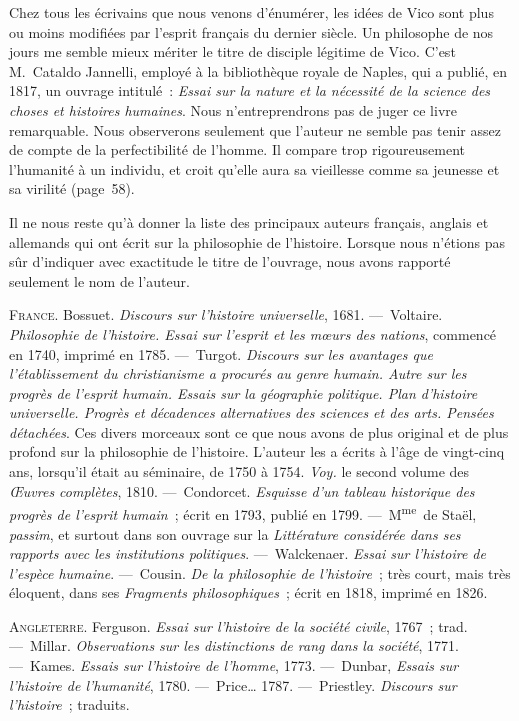 \documentclass[french,twoside]{book} %
\begin{document}
Chez tous les écrivains que nous venons d’énumérer, les idées de Vico sont plus ou moins modifiées par l’esprit français du dernier siècle. Un philosophe de nos jours me semble mieux mériter le titre de disciple légitime de Vico. C’est M. Cataldo Jannelli, employé à la bibliothèque royale de Naples, qui a publié, en 1817, un ouvrage intitulé : {\itshape Essai sur la nature et la nécessité de la science des choses et histoires humaines}. Nous n’entreprendrons pas de juger ce livre remarquable. Nous observerons seulement que l’auteur ne semble pas tenir assez de compte  de la perfectibilité de l’homme. Il compare trop rigoureusement l’humanité à un individu, et croit qu’elle aura sa vieillesse comme sa jeunesse et sa virilité (page 58).\par
\par
Il ne nous reste qu’à donner la liste des principaux auteurs français, anglais et allemands qui ont écrit sur la philosophie de l’histoire. Lorsque nous n’étions pas sûr d’indiquer avec exactitude le titre de l’ouvrage, nous avons rapporté seulement le nom de l’auteur.\par
{\scshape France.} Bossuet. {\itshape Discours sur l’histoire universelle}, 1681. — Voltaire. {\itshape Philosophie de l’histoire. Essai sur l’esprit et les mœurs des nations}, commencé en 1740, imprimé en 1785. — Turgot. {\itshape Discours sur les avantages que l’établissement du christianisme a procurés au genre humain. Autre sur les progrès de l’esprit humain. Essais sur la géographie politique. Plan d’histoire universelle. Progrès et décadences alternatives des sciences et des arts. Pensées détachées}. Ces divers morceaux sont ce que nous avons de plus original et de plus profond sur la philosophie de l’histoire. L’auteur les a écrits à l’âge de vingt-cinq ans, lorsqu’il était au séminaire, de 1750 à 1754. {\itshape Voy.} le second volume des {\itshape Œuvres complètes}, 1810. — Condorcet. {\itshape Esquisse d’un tableau historique des progrès de l’esprit humain} ; écrit en 1793, publié en 1799. — M\textsuperscript{me} de Staël, {\itshape passim}, et surtout dans son ouvrage sur la {\itshape Littérature considérée dans ses rapports avec les institutions politiques}. — Walckenaer. {\itshape Essai sur l’histoire de l’espèce humaine}. — Cousin. {\itshape De la philosophie de l’histoire} ; très court, mais très éloquent, dans ses {\itshape Fragments philosophiques} ; écrit en 1818, imprimé en 1826.\par
{\scshape Angleterre.} Ferguson. {\itshape Essai sur l’histoire de la société civile}, 1767 ; trad. — Millar. {\itshape Observations sur les distinctions de rang dans la société}, 1771. — Kames. {\itshape Essais sur l’histoire de l’homme}, 1773. — Dunbar, {\itshape Essais sur l’histoire de l’humanité}, 1780. — Price… 1787. — Priestley. {\itshape Discours sur l’histoire} ; traduits.\par
\end{document}
